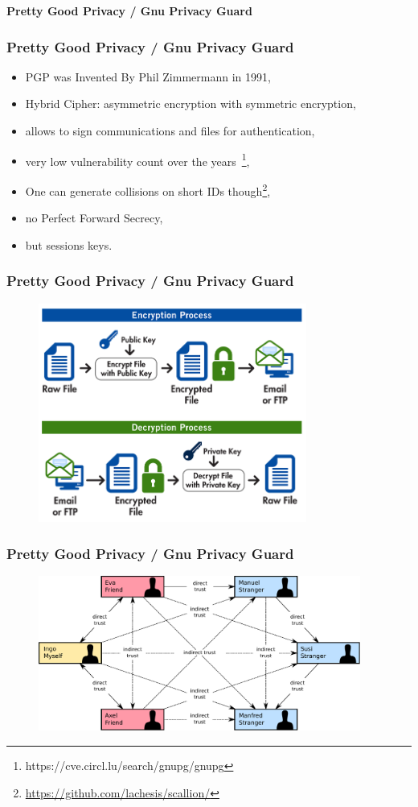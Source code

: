 \begin{frame}
  \begin{center}
    {\bf Pretty Good Privacy / Gnu Privacy Guard}
  \end{center}
\end{frame}

\begin{frame}
  \frametitle{Pretty Good Privacy / Gnu Privacy Guard}
  \begin{itemize}
    \item PGP was Invented By Phil Zimmermann in 1991,
    \item Hybrid Cipher: asymmetric encryption with symmetric encryption,
    \item allows to sign communications and files for authentication,
    \item very low vulnerability count over the years~\footnote{https://cve.circl.lu/search/gnupg/gnupg},
    \item One can generate collisions on short IDs though\footnote{\url{https://github.com/lachesis/scallion/}},
    \item no Perfect Forward Secrecy,
    \item but sessions keys.
  \end{itemize}
\end{frame}

\begin{frame}
  \frametitle{Pretty Good Privacy / Gnu Privacy Guard}
            \begin{figure}[h!]
              \includegraphics[width=250pt]{./gpg.png}
            \end{figure}
\end{frame}

\begin{frame}
  \frametitle{Pretty Good Privacy / Gnu Privacy Guard}
            \begin{figure}[h!]
              \includegraphics[width=300pt]{./wot.pdf}
            \end{figure}
\end{frame}

